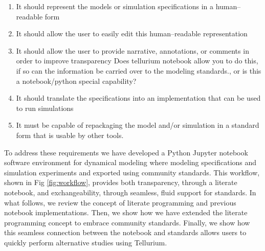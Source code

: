 \documentclass[10pt,letterpaper]{article}
\begin{document}
\begin{enumerate}
\item It should represent the models or simulation specifications in a human--readable form
\item It should allow the user to easily edit this human--readable representation
\item It should allow the user to provide narrative, annotations, or comments in order to improve transparency {\color{red} Does tellurium notebook allow you to do this, if so can the information be carried over to the modeling standards., or is this a notebook/python special capability?}
\item It should translate the specifications into an implementation that can be used to run simulations
\item It must be capable of repackaging the model and/or simulation in a standard form that is usable by other tools.
\end{enumerate}

To address these requirements we have developed a Python Jupyter notebook software environment for dynamical modeling where modeling specifications and simulation experiments and exported using community standards. This workflow, shown in Fig \ref{fig:workflow}, provides both transparency, through a literate notebook, and exchangeability, through seamless, fluid support for standards. In what follows, we review the concept of literate programming and previous notebook implementations. Then, we show how we have extended the literate programming concept to embrace community standards. Finally, we show how this seamless connection between the notebook and standards allows users to quickly perform alternative studies using Tellurium.
\end{document}
